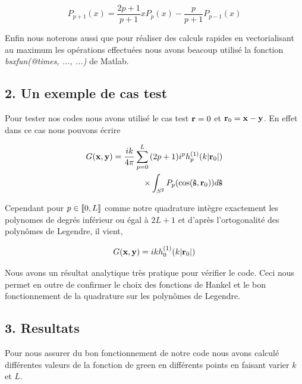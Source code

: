 \documentclass[10pt]{article}
\begin{document}
\begin{multicols}{2}
\begin{equation}
	P_{p+1}(x) =  \frac{2p+1}{p+1}xP_{p}(x) - \frac{p}{p+1}P_{p-1}(x) 
\end{equation}


Enfin nous noterons aussi que pour réaliser des calculs rapides en vectorialisant au maximum les opérations effectuées nous avons beacoup utilisé la fonction \textit{bsxfun(@times, ..., ...)} de Matlab.





\vspace*{10pt}


\subsection*{2. Un exemple de cas test}

Pour tester nos codes nous avons utilisé le cas test ${\bf r} = 0$ et ${\bf r}_0 = {\bf x} - {\bf y}$. En effet dans ce cas nous pouvons écrire

\begin{equation}
\begin{split}
G({\bf x},{\bf y}) = \frac{ik}{4\pi}\sum_{p=0}^{L}{} (2p+1)i^{p}h_p^{(1)}(k|{\bf r}_0|)  \\
 \times\int_{S^{2}}P_p(\cos({\bf \hat{s}}, {\bf r}_0))d{\bf \hat{s}} 
\end{split}
\end{equation}

Cependant pour $p\in \llbracket 0,L \rrbracket $ comme notre quadrature intègre exactement les polynomes de degrés inférieur ou égal à $2L+1$ et d'après l'ortogonalité des polynômes de Legendre, il vient, 

\begin{equation}
G({\bf x},{\bf y}) = ikh^{(1)}_{0}(k|{\bf r}_0|)
\end{equation}

Nous avons un résultat analytique très pratique pour vérifier le code. Ceci nous permet en outre de confirmer le choix des fonctions de Hankel et le bon fonctionnement de la quadrature sur les polynômes de Legendre. 



\vspace*{10pt}

\subsection*{3. Resultats}

Pour nous assurer du bon fonctionnement de notre code nous avons calculé différentes valeurs de la fonction de green en différents points en faisant varier $k$ et $L$. 

\end{multicols}
\end{document}
